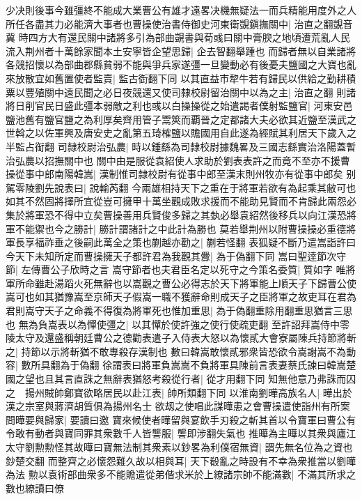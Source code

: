 少决則後事今雖彊終不能成大業曹公有雄才遠畧决機無疑法一而兵精能用度外之人所任各盡其力必能濟大事者也曹操使治書侍御史河東衛覬鎭撫關中|{
	治直之翻覬音冀}
時四方大有還民關中諸將多引為部曲覬書與荀彧曰關中膏腴之地頃遭荒亂人民流入荆州者十萬餘家聞本土安寧皆企望思歸|{
	企去智翻舉踵也}
而歸者無以自業諸將各競招懷以為部曲郡縣貧弱不能與爭兵家遂彊一旦變動必有後憂夫鹽國之大寶也亂來放散宜如舊置使者監賣|{
	監古衘翻下同}
以其直益市犂牛若有歸民以供給之勤耕積粟以豐殖關中遠民聞之必日夜競還又使司隸校尉留治關中以為之主|{
	治直之翻}
則諸將日削官民日盛此彊本弱敵之利也彧以白操操從之始遣謁者僕射監鹽官|{
	河東安邑鹽池舊有鹽官鹽之為利厚矣齊用管子鬻筴而覇晉之定都諸大夫必欲其近鹽至漢武之世斡之以佐軍興及唐安史之亂第五琦榷鹽以贍國用自此遂為經賦其利居天下歲入之半監占䘖翻}
司隸校尉治弘農|{
	時以鍾繇為司隸校尉據魏畧及三國志繇實治洛陽蓋暫治弘農以招撫關中也}
關中由是服從袁紹使人求助於劉表表許之而竟不至亦不援曹操從事中郎南陽韓嵩|{
	漢制惟司隸校尉有從事中郎至漢末則州牧亦有從事中郎矣}
别駕零陵劉先說表曰|{
	說輸芮翻}
今兩雄相持天下之重在于將軍若欲有為起乘其敝可也如其不然固將擇所宜從豈可擁甲十萬坐觀成敗求援而不能助見賢而不肯歸此兩怨必集於將軍恐不得中立矣曹操善用兵賢俊多歸之其埶必舉袁紹然後移兵以向江漢恐將軍不能禦也今之勝計|{
	勝計謂諸計之中此計為勝也}
莫若舉荆州以附曹操操必重德將軍長享福祚垂之後嗣此萬全之策也蒯越亦勸之|{
	蒯若怪翻}
表狐疑不斷乃遣嵩詣許曰今天下未知所定而曹操擁天子都許君為我觀其釁|{
	為于偽翻下同}
嵩曰聖逹節次守節|{
	左傳曹公子欣時之言}
嵩守節者也夫君臣名定以死守之今策名委質|{
	質如字}
唯將軍所命雖赴湯蹈火死無辭也以嵩觀之曹公必得志於天下將軍能上順天子下歸曹公使嵩可也如其猶豫嵩至京師天子假嵩一職不獲辭命則成天子之臣將軍之故吏耳在君為君則嵩守天子之命義不得復為將軍死也惟加重思|{
	為于偽翻重除用翻重思猶言三思也}
無為負嵩表以為憚使彊之|{
	以其憚於使許強之使行使疏吏翻}
至許詔拜嵩侍中零陵太守及還盛稱朝廷曹公之德勸表遣子入侍表大怒以為懷貳大會寮屬陳兵持節將斬之|{
	持節以示將斬猶不敢專殺存漢制也}
數曰韓嵩敢懷貳邪衆皆恐欲令嵩謝嵩不為動容|{
	數所具翻為于偽翻}
徐謂表曰將軍負嵩嵩不負將軍具陳前言表妻蔡氏諫曰韓嵩楚國之望也且其言直誅之無辭表猶怒考殺從行者|{
	從才用翻下同}
知無他意乃弗誅而囚之　揚州賊帥鄭寶欲略居民以赴江表|{
	帥所類翻下同}
以淮南劉曄高族名人|{
	曄出於漢之宗室與蔣濟胡質俱為揚州名士}
欲刼之使唱此謀曄患之會曹操遣使詣州有所案問曄要與歸家|{
	要讀曰邀}
寶來候使者曄留與宴飲手刃殺之斬其首以令寶軍曰曹公有令敢有動者與寶同罪其衆數千人皆讋服|{
	讋即涉翻失氣也}
推曄為主曄以其衆與廬江太守劉勲勲怪其故曄曰寶無法制其衆素以鈔畧為利僕宿無資|{
	謂先無名位為之資也鈔楚交翻}
而整齊之必懷怨難久故以相與耳|{
	天下殽亂之時設有不幸為衆推當以劉曄為法}
勲以袁術部曲衆多不能贍遣從弟偕求米於上繚諸宗帥不能滿數|{
	不滿其所求之數也繚讀曰僚}
